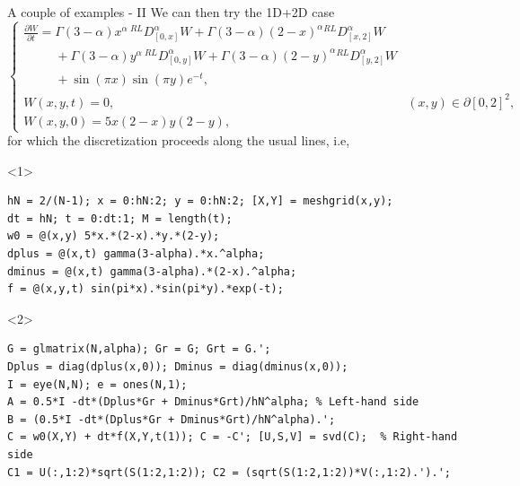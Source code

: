 \documentclass[aspectratio=169,xcolor=dvipsnames]{beamer}
\begin{document}
	\begin{frame}[fragile]{A couple of examples - II}
	We can then try the 1D+2D case
	\[
	\begin{cases}
	\frac{\partial W}{\partial t} = \Gamma(3-\alpha) x^\alpha\, {}^{RL}D_{[0,x]}^\alpha W + \Gamma(3-\alpha) (2-x)^\alpha {}^{RL}D_{[x,2]}^\alpha W  \\
	\phantom{\frac{\partial W}{\partial t} = } + \Gamma(3-\alpha) y^\alpha\, {}^{RL}D_{[0,y]}^\alpha W + \Gamma(3-\alpha) (2-y)^\alpha {}^{RL}D_{[y,2]}^\alpha W \\
	\phantom{\frac{\partial W}{\partial t} = } + \sin(\pi x) \sin(\pi y) e^{-t},\\
	W(x,y,t) =  0, & (x,y) \in \partial [0,2]^2,\\
	W(x,y,0) = 5x(2-x)y(2-y),
	\end{cases}
	\]
	for which the discretization proceeds along the usual lines, i.e,\vspace{-0.7em}
	\begin{onlyenv}
\begin{verbatim}
hN = 2/(N-1); x = 0:hN:2; y = 0:hN:2; [X,Y] = meshgrid(x,y);
dt = hN; t = 0:dt:1; M = length(t);
w0 = @(x,y) 5*x.*(2-x).*y.*(2-y);
dplus = @(x,t) gamma(3-alpha).*x.^alpha;
dminus = @(x,t) gamma(3-alpha).*(2-x).^alpha;
f = @(x,y,t) sin(pi*x).*sin(pi*y).*exp(-t);
\end{verbatim}
	\end{onlyenv}
\begin{onlyenv}<2>
\begin{verbatim}
G = glmatrix(N,alpha); Gr = G; Grt = G.';
Dplus = diag(dplus(x,0)); Dminus = diag(dminus(x,0));
I = eye(N,N); e = ones(N,1);
A = 0.5*I -dt*(Dplus*Gr + Dminus*Grt)/hN^alpha; % Left-hand side
B = (0.5*I -dt*(Dplus*Gr + Dminus*Grt)/hN^alpha).';
C = w0(X,Y) + dt*f(X,Y,t(1)); C = -C'; [U,S,V] = svd(C);  % Right-hand side
C1 = U(:,1:2)*sqrt(S(1:2,1:2)); C2 = (sqrt(S(1:2,1:2))*V(:,1:2).').';
\end{verbatim}
\end{onlyenv}
	\end{frame}
\end{document}

